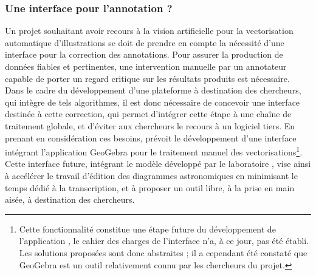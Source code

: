     \subsubsection{Une interface pour l'annotation ?}
    Un projet souhaitant avoir recours à la vision artificielle pour la vectorisation automatique d'illustrations se doit de prendre en compte la nécessité d'une interface pour la correction des annotations. Pour assurer la production de données fiables et pertinentes, une intervention manuelle par un annotateur capable de porter un regard critique sur les résultats produits est nécessaire. Dans le cadre du développement d'une plateforme à destination des chercheurs, qui intègre de tels algorithmes, il est donc nécessaire de concevoir une interface destinée à cette correction, qui permet d'intégrer cette étape à une chaîne de traitement globale, et d'éviter aux chercheurs le recours à un logiciel tiers. En prenant en considération ces besoins, \eida prévoit le développement d'une interface intégrant l'application GeoGebra pour le traitement manuel des vectorisations\footnote{Cette fonctionnalité constitue une étape future du développement de l'application \eida, le cahier des charges de l'interface n'a, à ce jour, pas été établi. Les solutions proposées sont donc abstraites ; il a cependant été constaté que GeoGebra est un outil relativement connu par les chercheurs du projet.}. Cette interface future, intégrant le modèle développé par le laboratoire \imagine, vise ainsi à accélérer le travail d'édition des diagrammes astronomiques en minimisant le temps dédié à la transcription, et à proposer un outil libre, à la prise en main aisée, à destination des chercheurs.